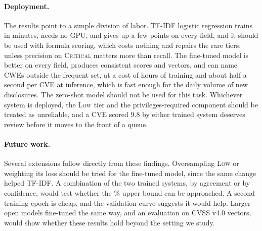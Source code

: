 \paragraph{Deployment.}
The results point to a simple division of labor.
TF-IDF logistic regression trains in minutes, needs no GPU, and gives up a few points on every field, and it should be used with formula scoring, which costs nothing and repairs the rare tiers, unless precision on \textsc{Critical} matters more than recall.
The fine-tuned model is better on every field, produces consistent scores and vectors, and can name CWEs outside the frequent set, at a cost of \nLoraTrainHours{} hours of training and about half a second per CVE at inference, which is fast enough for the daily volume of new disclosures.
The zero-shot model should not be used for this task.
Whichever system is deployed, the \textsc{Low} tier and the privileges-required component should be treated as unreliable, and a CVE scored 9.8 by either trained system deserves review before it moves to the front of a queue.

\paragraph{Future work.}
Several extensions follow directly from these findings.
Oversampling \textsc{Low} or weighting its loss should be tried for the fine-tuned model, since the same change helped TF-IDF.
A combination of the two trained systems, by agreement or by confidence, would test whether the \nEitherSev\% upper bound can be approached.
A second training epoch is cheap, and the validation curve suggests it would help.
Larger open models fine-tuned the same way, and an evaluation on CVSS v4.0 vectors, would show whether these results hold beyond the setting we study.
